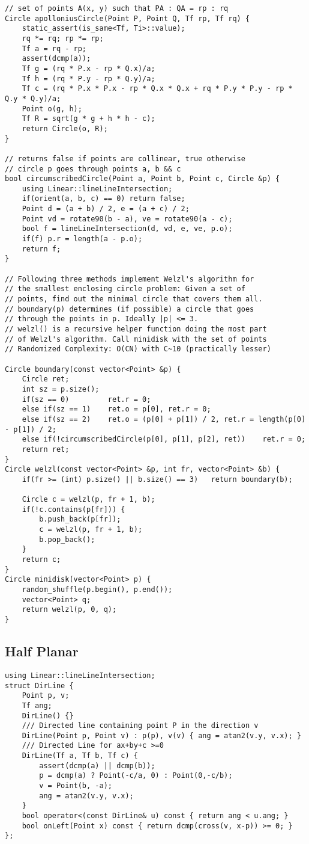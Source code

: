 \documentclass[FSZ,a4paper,onesided]{article}
\begin{document}
\begin{multicols*}{\COLS}
\begin{lstlisting}
// set of points A(x, y) such that PA : QA = rp : rq
Circle apolloniusCircle(Point P, Point Q, Tf rp, Tf rq) {
    static_assert(is_same<Tf, Ti>::value);
    rq *= rq; rp *= rp;
    Tf a = rq - rp;
    assert(dcmp(a));
    Tf g = (rq * P.x - rp * Q.x)/a;
    Tf h = (rq * P.y - rp * Q.y)/a;
    Tf c = (rq * P.x * P.x - rp * Q.x * Q.x + rq * P.y * P.y - rp * Q.y * Q.y)/a;
    Point o(g, h);
    Tf R = sqrt(g * g + h * h - c);
    return Circle(o, R);
}

// returns false if points are collinear, true otherwise
// circle p goes through points a, b && c
bool circumscribedCircle(Point a, Point b, Point c, Circle &p) {
    using Linear::lineLineIntersection;
    if(orient(a, b, c) == 0) return false;
    Point d = (a + b) / 2, e = (a + c) / 2;
    Point vd = rotate90(b - a), ve = rotate90(a - c);
    bool f = lineLineIntersection(d, vd, e, ve, p.o);
    if(f) p.r = length(a - p.o);
    return f;
}

// Following three methods implement Welzl's algorithm for
// the smallest enclosing circle problem: Given a set of
// points, find out the minimal circle that covers them all.
// boundary(p) determines (if possible) a circle that goes
// through the points in p. Ideally |p| <= 3.
// welzl() is a recursive helper function doing the most part
// of Welzl's algorithm. Call minidisk with the set of points
// Randomized Complexity: O(CN) with C~10 (practically lesser)

Circle boundary(const vector<Point> &p) {
    Circle ret;
    int sz = p.size();
    if(sz == 0)         ret.r = 0;
    else if(sz == 1)    ret.o = p[0], ret.r = 0;
    else if(sz == 2)    ret.o = (p[0] + p[1]) / 2, ret.r = length(p[0] - p[1]) / 2;
    else if(!circumscribedCircle(p[0], p[1], p[2], ret))    ret.r = 0;
    return ret;
}
Circle welzl(const vector<Point> &p, int fr, vector<Point> &b) {
    if(fr >= (int) p.size() || b.size() == 3)   return boundary(b);

    Circle c = welzl(p, fr + 1, b);
    if(!c.contains(p[fr])) {
        b.push_back(p[fr]);
        c = welzl(p, fr + 1, b);
        b.pop_back();
    }
    return c;
}
Circle minidisk(vector<Point> p) {
    random_shuffle(p.begin(), p.end());
    vector<Point> q;
    return welzl(p, 0, q);
}\end{lstlisting}
\subsection{Half Planar}
\begin{lstlisting}
using Linear::lineLineIntersection;
struct DirLine {
    Point p, v;
    Tf ang;
    DirLine() {}
    /// Directed line containing point P in the direction v
    DirLine(Point p, Point v) : p(p), v(v) { ang = atan2(v.y, v.x); }
    /// Directed Line for ax+by+c >=0
    DirLine(Tf a, Tf b, Tf c) {
        assert(dcmp(a) || dcmp(b));
        p = dcmp(a) ? Point(-c/a, 0) : Point(0,-c/b);
        v = Point(b, -a);
        ang = atan2(v.y, v.x);
    }
    bool operator<(const DirLine& u) const { return ang < u.ang; }
    bool onLeft(Point x) const { return dcmp(cross(v, x-p)) >= 0; }
};


\end{lstlisting}
\end{multicols*}
\end{document}
